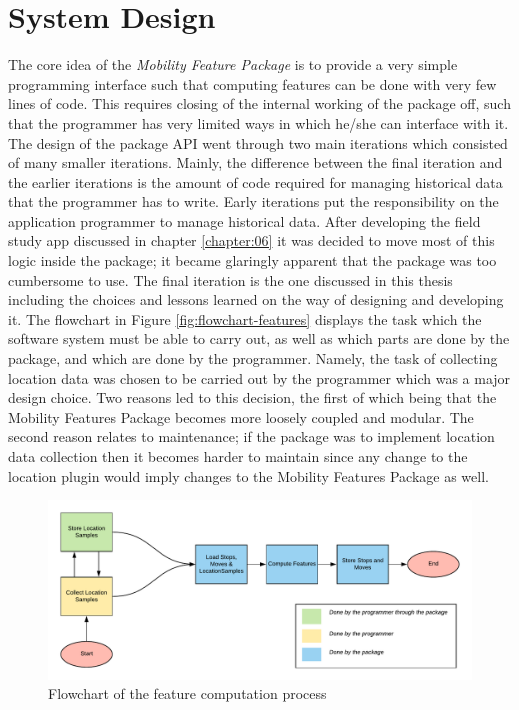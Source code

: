\section{System Design}
The core idea of the \textit{Mobility Feature Package} is to provide a very simple programming interface such that computing features can be done with very few lines of code. This requires closing of the internal working of the package off, such that the programmer has very limited ways in which he/she can interface with it. The design of the package API went through two main iterations which consisted of many smaller iterations. Mainly, the difference between the final iteration and the earlier iterations is the amount of code required for managing historical data that the programmer has to write. Early iterations put the responsibility on the application programmer to manage historical data. After developing the field study app discussed in chapter \ref{chapter:06} it was decided to move most of this logic inside the package; it became glaringly apparent that the package was too cumbersome to use. The final iteration is the one discussed in this thesis including the choices and lessons learned on the way of designing and developing it. The flowchart in Figure \ref{fig:flowchart-features} displays the task which the software system must be able to carry out, as well as which parts are done by the package, and which are done by the programmer. Namely, the task of collecting location data was chosen to be carried out by the programmer which was a major design choice. Two reasons led to this decision, the first of which being that the Mobility Features Package becomes more loosely coupled and modular. The second reason relates to maintenance; if the package was to implement location data collection then it becomes harder to maintain since any change to the location plugin would imply changes to the Mobility Features Package as well. 

\begin{figure}[h]
    \centering
    \includegraphics[width=\textwidth]{images/diagrams/flowchart.pdf}
    \caption{Flowchart of the feature computation process}
    \label{fig:my_label}
\end{figure}


